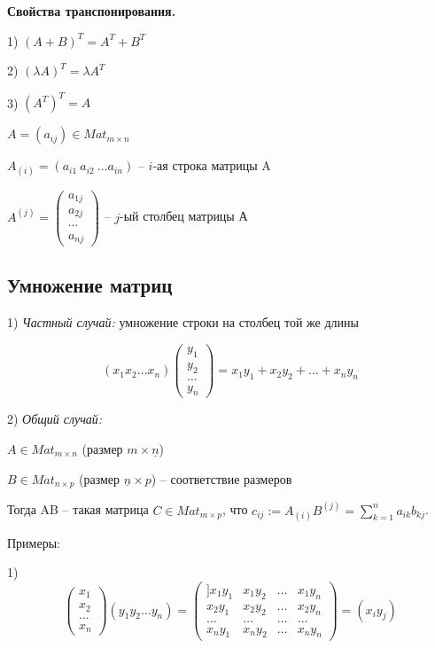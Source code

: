 \vspace{\baselineskip}
\textbf{Свойства транспонирования.}

1) $(A+B)^T = A^T + B^T$

2) $(\lambda A)^T = \lambda A^T$

3) $(A^T)^T = A$

\vspace{\baselineskip}
$A = (a_{ij}) \in Mat_{m \times n}$

$A_{(i)} = (a_{i1}\ a_{i2}\ \dots a_{in})$ -- $i$-ая строка матрицы A

$A^{(j)} = \begin{pmatrix}
    a_{1j} \\
    a_{2j} \\
    \cdots \\
    a_{nj}
	\end{pmatrix}$ -- $j$-ый столбец матрицы А

\vspace{\baselineskip}
\subsection{Умножение матриц}

1) \textit{Частный случай:} умножение строки на столбец той же длины

\[(x_1 x_2 \dots x_n) \begin{pmatrix} y_1 \\ y_2 \\ \dots \\ y_n \end{pmatrix} = x_1 y_1 + x_2 y_2 + \dots + x_n y_n \]

2) \textit{Общий случай:}

$A \in Mat_{m \times n}$ (размер $m \times \underline{n}$)

$B \in Mat_{n \times p}$ (размер $\underline{n} \times p$) -- соответствие размеров

\vspace{\baselineskip}
Тогда AB -- такая матрица $C \in Mat_{m \times p}$, что $c_{ij} := A_{(i)}B^{(j)} = \sum\limits_{k=1}^n a_{ik} b_{kj}$.

Примеры:

1) \[ \begin{pmatrix} x_1 \\ x_2 \\ \dots \\ x_n \end{pmatrix} (y_1 y_2 \dots y_n) = \begin{pmatrix}]
x_1 y_1 & x_1 y_2 & \dots & x_1 y_n \\
x_2 y_1 & x_2 y_2 & \dots & x_2 y_n \\
\dots & \dots & \dots & \dots \\
x_n y_1 & x_n y_2 & \dots & x_n y_n
\end{pmatrix} = (x_i y_j) \]

